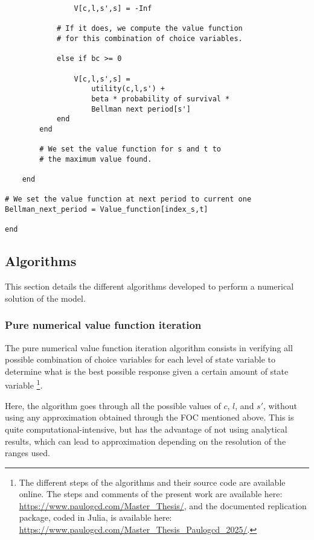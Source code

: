 \documentclass{article}
\begin{document}
\begin{itemize}
\begin{lstlisting}
                V[c,l,s',s] = -Inf 
            
            # If it does, we compute the value function 
            # for this combination of choice variables.
            
            else if bc >= 0

                V[c,l,s',s] =
                    utility(c,l,s') +
                    beta * probability of survival *
                    Bellman next period[s']
            end
        end
        
        # We set the value function for s and t to
        # the maximum value found.
        
    end

# We set the value function at next period to current one
Bellman_next_period = Value_function[index_s,t]

end
\end{lstlisting}

\end{itemize}


\subsection{Algorithms}

This section details the different algorithms
developed to perform a numerical 
solution of the model. 

\subsubsection{Pure numerical value function iteration}

The pure numerical value function iteration algorithm consists
in verifying all possible 
combination of choice variables for each level of state variable 
to determine what is the best possible response given a certain
amount of state variable \footnote{The different steps of the algorithms and their source code are available online.
The steps and comments of the present work are available here: \url{https://www.paulogcd.com/Master_Thesis/},
and the documented replication package, coded in Julia, is available here: \url{https://www.paulogcd.com/Master_Thesis_Paulogcd_2025/}.}.

Here, the algorithm goes through all the possible values of
$c$, $l$, and $s'$, without using any approximation obtained 
through the FOC mentioned above. 
This is quite computational-intensive, but 
has the advantage of not using analytical results, 
which can lead to approximation depending on the resolution of the 
ranges used.
\end{document}
